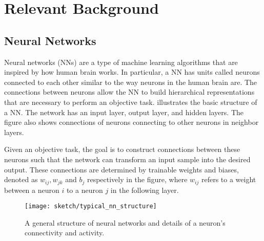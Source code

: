 \chapter{Relevant Background}
\label{cha:chapter3}

\section{Neural Networks}
Neural networks (NNs) are a type of machine learning algorithms that are inspired by how human brain works.  In particular, a NN has units called neurons connected to each other similar to the way neurons in the human brain are. The connections between neurons allow the NN to build hierarchical representations that are necessary to perform an objective task. \addfigure{\ref{fig:nn_typical_structure}} illustrates the basic structure of a NN. The network has an input layer, output layer, and hidden layers. The figure also shows connections of neurons connecting to other neurons in neighbor layers. 

Given an objective task, the goal is to construct connections between these neurons such that the network can transform an input sample into the desired output.  These connections are determined by trainable weights and biases, denoted as $w_{ij}, w_{jk}$ and $b_j$ respectively in the figure, where $w_{ij}$ refers to a weight between a neuron $i$ to a neuron $j$ in the following layer.


%
%
%

 \begin{figure}
    \begin{center}

\texttt{[image: sketch/typical\_nn\_structure]}
\caption[]{A general structure of neural networks and details of a neuron's connectivity and activity.}
\label{fig:nn_typical_structure}

\end{center}
\end{figure}


